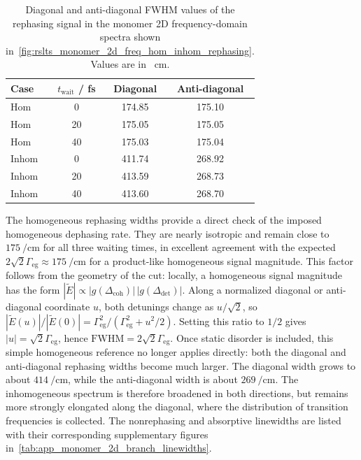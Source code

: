 \begin{table}[htbp]
    \centering
    \small
    \caption{Diagonal and anti-diagonal FWHM values of the rephasing signal in the monomer 2D frequency-domain spectra shown in~\autoref{fig:rslts_monomer_2d_freq_hom_inhom_rephasing}. Values are in \si{\per\centi\metre}.}
    \label{tab:results_monomer_2d_rephasing_linewidths}
    \begin{tabular}{@{}lccc@{}}
        \toprule
        Case & $t_{\mathrm{wait}}$ / fs & Diagonal & Anti-diagonal \\
        \midrule
        Hom & 0  & 174.85 & 175.10 \\
        Hom & 20 & 175.05 & 175.05 \\
        Hom & 40 & 175.03 & 175.04 \\
        Inhom & 0  & 411.74 & 268.92 \\
        Inhom & 20 & 413.59 & 268.73 \\
        Inhom & 40 & 413.60 & 268.70 \\
        \bottomrule
    \end{tabular}
\end{table}

The homogeneous rephasing widths provide a direct check of the imposed
homogeneous dephasing rate. They are nearly isotropic and remain close to
\(\SI{175}{\per\centi\metre}\) for all three waiting times, in excellent
agreement with the expected
\(2\sqrt{2}\Gamma_{\mathrm{eg}}\approx\SI{175}{\per\centi\metre}\) for a
product-like homogeneous signal magnitude. This factor follows from the geometry of the cut: locally, a homogeneous signal magnitude has the form \(|\tilde{E}|\propto |g(\Delta_{\mathrm{coh}})|\,|g(\Delta_{\mathrm{det}})|\). Along a normalized diagonal or anti-diagonal coordinate \(u\), both detunings change as \(u/\sqrt{2}\), so \(|\tilde{E}(u)|/|\tilde{E}(0)|=\Gamma_{\mathrm{eg}}^{2}/(\Gamma_{\mathrm{eg}}^{2}+u^{2}/2)\). Setting this ratio to \(1/2\) gives \(|u|=\sqrt{2}\Gamma_{\mathrm{eg}}\), hence \(\mathrm{FWHM}=2\sqrt{2}\Gamma_{\mathrm{eg}}\). Once static disorder is included,
this simple homogeneous reference no longer applies directly: both the diagonal
and anti-diagonal rephasing widths become much larger. The diagonal width grows
to about \(\SI{414}{\per\centi\metre}\), while the anti-diagonal width is about
\(\SI{269}{\per\centi\metre}\). The inhomogeneous spectrum is therefore
broadened in both directions, but remains more strongly elongated along the
diagonal, where the distribution of transition frequencies is collected. The
nonrephasing and absorptive linewidths are listed with their corresponding
supplementary figures in~\autoref{tab:app_monomer_2d_branch_linewidths}.

